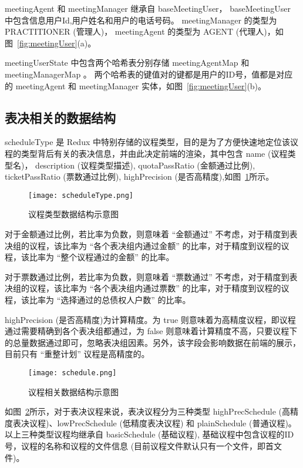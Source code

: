   meetingAgent 和 meetingManager 继承自 baseMeetingUser， baseMeetingUser 中包含信息用户Id,用户姓名和用户的电话号码。 meetingManager 的类型为 PRACTITIONER (管理人)， meetingAgent 的类型为 AGENT (代理人)，如图~\ref{fig:meetingUser}(a)。

  meetingUserState 中包含两个哈希表分别存储 meetingAgentMap 和
  meetingManagerMap 。 两个哈希表的键值对的键都是用户的ID号，值都是对应的 meetingAgent 和 meetingManager 实体，如图~\ref{fig:meetingUser}(b)。

  \subsection{表决相关的数据结构}

  scheduleType 是 Redux 中特别存储的议程类型，目的是为了方便快速地定位该议程的类型背后有关的表决信息，并由此决定前端的渲染，其中包含 name (议程类型名)， description (议程类型描述), quotaPassRatio (金额通过比例), ticketPassRatio (票数通过比例), highPrecision (是否高精度),如图~\ref{fig:scheduleType}所示。

  \begin{figure}[!htp]
    \centering
    \texttt{[image: scheduleType.png]}
    \caption{议程类型数据结构示意图}
    \label{fig:scheduleType}
  \end{figure}

  对于金额通过比例，若比率为负数，则意味着 “金额通过” 不考虑，对于精度到表决组的议程，该比率为 “各个表决组内通过金额” 的比率，对于精度到议程的议程，该比率为 “整个议程通过的金额” 的比率。

  对于票数通过比例，若比率为负数，则意味着 “票数通过” 不考虑，对于精度到表决组的议程，该比率为 “各个表决组内通过票数” 的比率，对于精度到议程的议程，该比率为 “选择通过的总债权人户数” 的比率。

  highPrecision (是否高精度)为计算精度。为 true 则意味着为高精度议程，即议程通过需要精确到各个表决组都通过，为 false 则意味着计算精度不高，只要议程下的总量数据通过即可，忽略表决组因素。另外，该字段会影响数据在前端的展示，目前只有 “重整计划” 议程是高精度的。

    \begin{figure}[!htp]
      \centering
      \texttt{[image: schedule.png]}
      \caption{议程相关数据结构示意图}
      \label{fig:schedule}
    \end{figure}

    如图~\ref{fig:schedule}所示，对于表决议程来说，表决议程分为三种类型 highPrecSchedule (高精度表决议程)、lowPrecSchedule (低精度表决议程) 和 plainSchedule (普通议程)。以上三种类型议程均继承自 basicSchedule (基础议程), 基础议程中包含议程的ID号，议程的名称和议程的文件信息 (目前议程文件默认只有一个文件，即首文件)。


